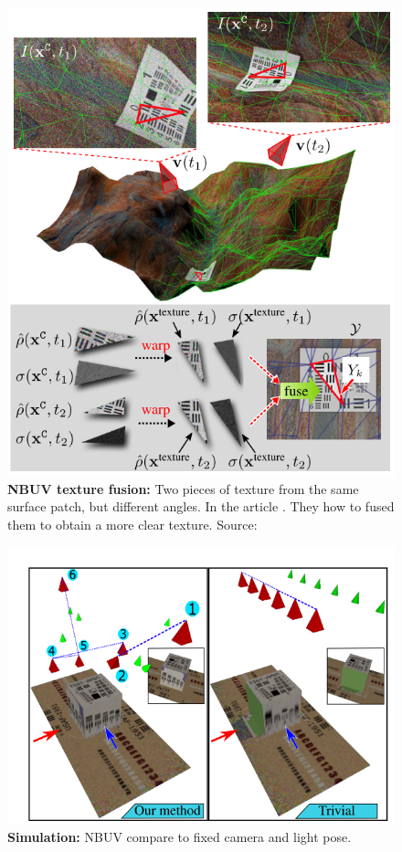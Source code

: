\documentclass{article}
\begin{document}
\begin{figure}[h!]
\centering
\includegraphics[width=\textwidth]{NBUV_texture_fusion.png}
\caption{\textbf{NBUV texture fusion:} Two pieces of texture from the same surface patch, but different angles. In the article \cite{sheinin2016next}. They how to fused them to obtain a more clear texture. Source: \cite{sheinin2016next}}
\label{fig:NBUV_txture}
\end{figure}

\begin{figure}[h!]
\centering
\includegraphics[width=\textwidth]{NBUV_simulation.png}
\caption{\textbf{Simulation:} NBUV compare to fixed camera and light pose.}
\label{fig:simulation}
\end{figure}
\end{document}
